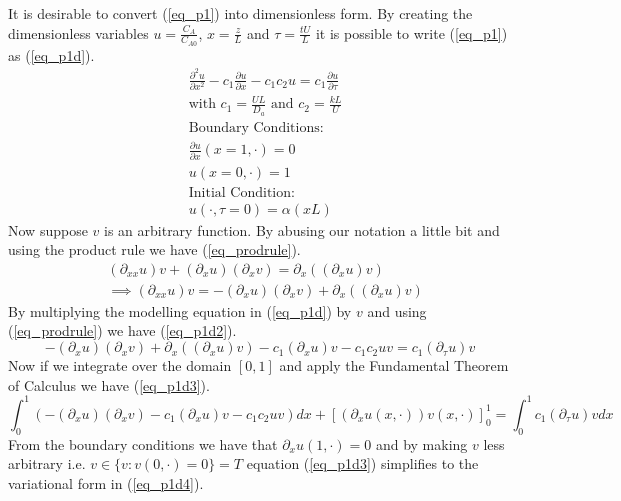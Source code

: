 \documentclass[11pt,fleqn]{article}
\theoremstyle{defstyle}
\begin{document}
It is desirable to convert (\ref{eq_p1}) into dimensionless form. By creating the dimensionless variables $u=\frac{C_A}{C_{A0}}$, $x = \frac{z}{L}$ and $\tau = \frac{tU}{L}$ it is possible to write (\ref{eq_p1}) as (\ref{eq_p1d}).
\begin{equation}
\begin{aligned}
&\frac{\partial^2 u}{\partial x^2} - c_1 \frac{\partial u}{\partial x} - c_1c_2u = 
c_1\frac{\partial u}{\partial \tau} \\
&\text{with } c_1 = \frac{UL}{D_a} \text{ and } c_2 = \frac{kL}{U} \\
&\text{Boundary Conditions:} \\
&\frac{\partial u}{\partial x}(x=1, \cdot) = 0\\
&u(x=0, \cdot) = 1 \\
&\text{Initial Condition:} \\
& u(\cdot, \tau = 0) = \alpha(xL)
\end{aligned}
\label{eq_p1d}
\end{equation}
Now suppose $v$ is an arbitrary function. By abusing our notation a little bit and using the product rule we have (\ref{eq_prodrule}).
\begin{equation}
\begin{aligned}
&(\partial_{xx}u)v + (\partial_xu)(\partial_xv) = \partial_x( (\partial_xu)v)\\
&\implies (\partial_{xx}u)v = -(\partial_xu)(\partial_xv) + \partial_x( (\partial_xu)v)
\end{aligned}
\label{eq_prodrule}
\end{equation}
By multiplying the modelling equation in (\ref{eq_p1d}) by $v$ and using (\ref{eq_prodrule}) we have (\ref{eq_p1d2}).
\begin{equation}
 -(\partial_xu)(\partial_xv) + \partial_x( (\partial_xu)v) - c_1(\partial_xu)v - c_1c_2uv = c_1(\partial_{\tau}u)v 
\label{eq_p1d2}
\end{equation}
Now if we integrate over the domain $[0, 1]$ and apply the Fundamental Theorem of Calculus we have (\ref{eq_p1d3}).
\begin{equation}
\int_0^1 (-(\partial_xu)(\partial_xv) - c_1(\partial_xu)v - c_1c_2uv)dx + [(\partial_xu(x, \cdot))v(x, \cdot)]^1_0 = \int^1_0 c_1(\partial_{\tau}u)v dx
\label{eq_p1d3}
\end{equation}
From the boundary conditions we have that $\partial_xu(1,\cdot)=0$ and by making $v$ less arbitrary i.e. $v \in \{v : v(0, \cdot)=0 \} = T$ equation (\ref{eq_p1d3}) simplifies to the variational form in (\ref{eq_p1d4}).
\end{document}
